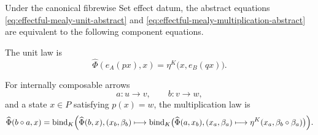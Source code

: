 \begin{proposition}
\label{prop:effectful-mealy-laws}
    Under the canonical fibrewise Set effect datum, the abstract equations
    \eqref{eq:effectful-mealy-unit-abstract} and
    \eqref{eq:effectful-mealy-multiplication-abstract} are equivalent to the
    following component equations.

    The unit law is
    \begin{equation}
        \widehat\Phi(e_A(px),x)
        =
        \eta^K
        \bigl(x,e_B(qx)\bigr).
        \label{eq:effectful-mealy-unit-component}
    \end{equation}

    For internally composable arrows
    \[
        a:u\to v,
        \qquad
        b:v\to w,
    \]
    and a state \(x\in P\) satisfying \(p(x)=w\), the multiplication law is
    \begin{equation}
    \begin{aligned}
        \widehat\Phi(b\circ a,x)
        =
        \operatorname{bind}_{K}
        \Bigl(
            \widehat\Phi(b,x),
            (x_b,\beta_b)
            \longmapsto
            \operatorname{bind}_{K}
            \bigl(
                \widehat\Phi(a,x_b),
                (x_a,\beta_a)
                \longmapsto
                \eta^K
                (x_a,\beta_b\circ\beta_a)
            \bigr)
        \Bigr).
    \end{aligned}
    \label{eq:effectful-mealy-composition-component}
    \end{equation}
\end{proposition}

